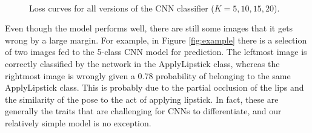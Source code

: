 \documentclass[letterpaper, 10 pt, conference]{IEEEtran}
\begin{document}
\begin{figure}[h!]
     \centering
     \\
        \caption{Loss curves for all versions of the CNN classifier ($K=5,10,15,20$).}
        \label{fig:loss_comparison}
\end{figure}

Even though the model performs well, there are still some images that it gets wrong by a large margin. For example, in Figure \ref{fig:example} there is a selection of two images fed to the 5-class CNN model for prediction. The leftmost image is correctly classified by the network in the ApplyLipstick class, whereas the rightmost image is wrongly given a 0.78 probability of belonging to the same ApplyLipstick class. This is probably due to the partial occlusion of the lips and the similarity of the pose to the act of applying lipstick. In fact, these are generally the traits that are challenging for CNNs to differentiate, and our relatively simple model is no exception.
\end{document}
